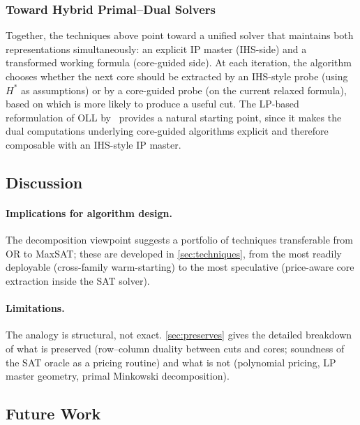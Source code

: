 \subsubsection{Toward Hybrid Primal--Dual Solvers}

Together, the techniques above point toward a unified solver that maintains
both representations simultaneously: an explicit IP master (IHS-side) and a
transformed working formula (core-guided side). At each iteration, the
algorithm chooses whether the next core should be extracted by an IHS-style
probe (using $H^*$ as assumptions) or by a core-guided probe (on the current
relaxed formula), based on which is more likely to produce a useful cut. The
LP-based reformulation of OLL by~\citet{katsirelos2025core} provides a
natural starting point, since it makes the dual computations underlying
core-guided algorithms explicit and therefore composable with an IHS-style
IP master.

\subsection{Discussion}
\label{sec:discussion}

\paragraph{Implications for algorithm design.}
The decomposition viewpoint suggests a portfolio of techniques transferable
from OR to MaxSAT; these are developed in \cref{sec:techniques}, from
the most readily deployable (cross-family warm-starting) to the most
speculative (price-aware core extraction inside the SAT solver).

\paragraph{Limitations.}
The analogy is structural, not exact. \cref{sec:preserves} gives the
detailed breakdown of what is preserved (row--column duality between cuts and
cores; soundness of the SAT oracle as a pricing routine) and what is not
(polynomial pricing, LP master geometry, primal Minkowski decomposition).

\subsection{Future Work}
\label{sec:future}

